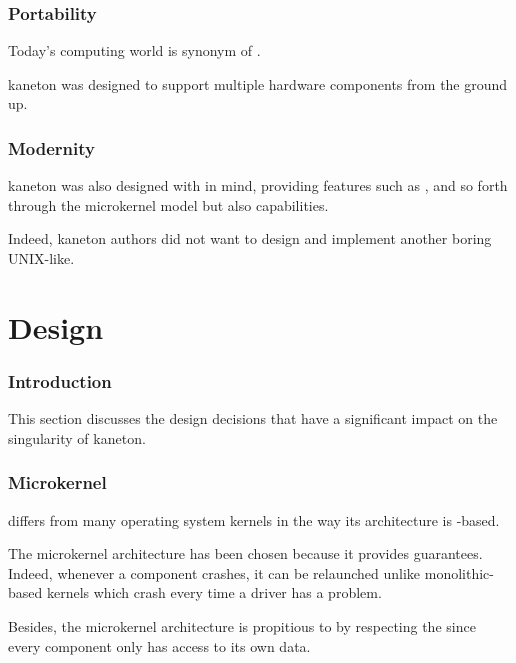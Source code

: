 
\begin{frame}
  \frametitle{Portability}

  Today's computing world is synonym of .

  \-

  kaneton was designed to support multiple hardware components from the
  ground up.
\end{frame}


\begin{frame}
  \frametitle{Modernity}

  kaneton was also designed with  in mind, providing features
  such as ,  and so forth through the microkernel
  model but also  capabilities.

  \-

  Indeed, kaneton authors did not want to design and implement another
  boring UNIX-like.
\end{frame}

%
%

\section{Design}


\begin{frame}
  \frametitle{Introduction}

  This section discusses the design decisions that have a significant
  impact on the singularity of kaneton.
\end{frame}


\begin{frame}
  \frametitle{Microkernel}

   differs from many operating system kernels in the way its
  architecture is -based.

  \-

  The microkernel architecture has been chosen because it provides
   guarantees. Indeed, whenever a component crashes, it can be
  relaunched unlike monolithic-based kernels which crash every time a
  driver has a problem.

  \-

  Besides, the microkernel architecture is propitious to  by
  respecting the  since every component only
  has access to its own data.
\end{frame}

